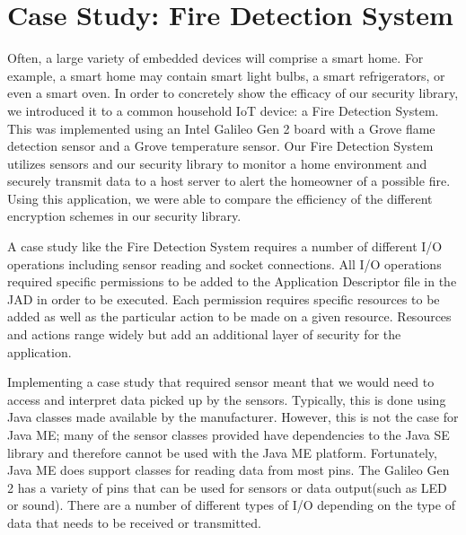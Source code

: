 \section{Case Study: Fire Detection System}

Often, a large variety of embedded devices will comprise a smart home. For example, a smart home may contain smart light bulbs, a smart refrigerators, or even a smart oven. In order to concretely show the efficacy of our security library, we introduced it to a common household IoT device: a Fire Detection System. This was implemented using an Intel Galileo Gen 2 board with a Grove flame detection sensor and a Grove temperature sensor. Our Fire Detection System utilizes  sensors  and our security library to monitor a home environment and securely transmit data to a host server to alert the homeowner of a possible fire. Using this application, we were able to compare the efficiency of the different encryption schemes in our security library.

A case study like the Fire Detection System requires a number of different I/O operations including sensor reading and socket connections. All I/O operations required specific permissions to be added to the Application Descriptor file in the JAD in order to be executed. Each permission requires specific resources to be added as well as the particular action to be made on a given resource. Resources and actions range widely but add an additional layer of security for the application.

Implementing a case study that required sensor meant that we would need to access and interpret data picked up by the sensors. Typically, this is done using Java classes made available by the manufacturer. However, this is not the case for Java ME; many of the sensor classes provided have dependencies to  the Java SE library and therefore cannot be used with the Java ME platform. Fortunately, Java ME does support classes for reading data from most pins. The Galileo Gen 2 has a variety of pins that can be used for sensors or data output(such as LED or sound). There are a number of different types of I/O depending on the type of data that needs to be received or transmitted.

